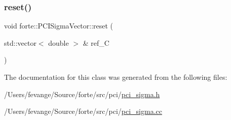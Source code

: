 \mbox{\label{classforte_1_1_p_c_i_sigma_vector_a5ad3aa335c3fd9428e496c9d82ceaf9b}} 
\subsubsection{\texorpdfstring{reset()}{reset()}}
{\footnotesize\ttfamily void forte\+::\+P\+C\+I\+Sigma\+Vector\+::reset (\begin{DoxyParamCaption}\item[{std\+::vector$<$ double $>$ \&}]{ref\+\_\+C }\end{DoxyParamCaption})}



The documentation for this class was generated from the following files\+:\begin{DoxyCompactItemize}
\item 
/\+Users/fevange/\+Source/forte/src/pci/\mbox{\hyperlink{pci__sigma_8h}{pci\+\_\+sigma.\+h}}\item 
/\+Users/fevange/\+Source/forte/src/pci/\mbox{\hyperlink{pci__sigma_8cc}{pci\+\_\+sigma.\+cc}}\end{DoxyCompactItemize}
